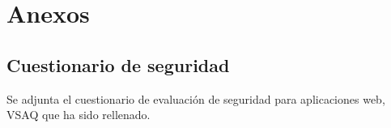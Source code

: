 \chapter{Anexos}
\label{chap:supporting}

\section{Cuestionario de seguridad}
Se adjunta el cuestionario de evaluación de seguridad para aplicaciones web, VSAQ \cite{VSAQ} que ha sido rellenado.





